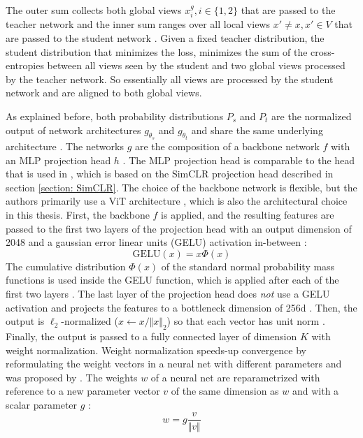 The outer sum collects both global views $x_i^g, i\in\{1,2\}$ that are passed to the teacher network and the inner sum ranges over all local views $x\prime \neq x, x \prime \in V $ that are passed to the student network \citep{Caron2021}.
Given a fixed teacher distribution, the student distribution that minimizes the loss, minimizes the sum of the cross-entropies between all views seen by the student and two global views processed by the teacher network.
So essentially all views are processed by the student network and are aligned to both global views.
\par
As explained before, both probability distributions $P_s$ and $P_t$ are the normalized output of network architectures $g_{\theta_s}$ and $g_{\theta_t}$ and share the same underlying architecture \citep{Caron2021}.
The networks $g$ are the composition of a backbone network $f$ with an MLP projection head $h$ \citep{Caron2021}.
The MLP projection head is comparable to the head that is used in \citep{Caron2020}, which is based on the SimCLR projection head described in section \ref{section: SimCLR}.
The choice of the backbone network is flexible, but the authors primarily use a ViT architecture \citep{Dosovitskiy2020}, which is also the architectural choice in this thesis.
First, the backbone $f$ is applied, and the resulting features are passed to the first two layers of the projection head with an output dimension of 2048 and a gaussian error linear units (GELU) activation in-between \citep{Hendrycks2016b}:
\begin{equation}
\text{GELU}(x) = x \Phi(x)
\end{equation}
The cumulative distribution $\Phi(x)$ of the standard normal probability mass functions is used inside the GELU function, which is applied after each of the first two layers \citep{Hendrycks2016b}.
The last layer of the projection head does \textit{not} use a GELU activation and projects the features to a bottleneck dimension of 256d \citep{Caron2021}.
Then, the output is $\ell_2$-normalized ($x \leftarrow x/\Vert x \Vert_2$) so that each vector has unit norm \citep{Caron2021}.
Finally, the output is passed to a fully connected layer of dimension $K$ with weight normalization.
Weight normalization speeds-up convergence by reformulating the weight vectors in a neural net with different parameters and was proposed by \citep{Salimans2016}.
The weights $w$ of a neural net are reparametrized with reference to a new parameter vector $v$ of the same dimension as $w$ and with a scalar parameter $g$ \citep{Salimans2016}:
\begin{equation}
	w = g \frac{v}{\Vert v \Vert}
\end{equation}

